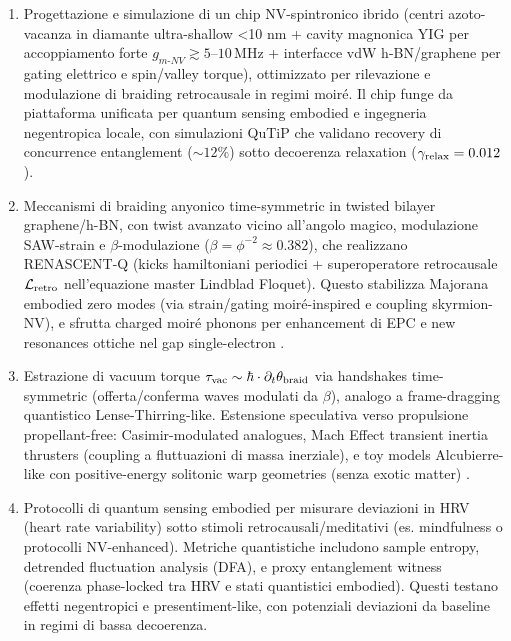 \documentclass[11pt,a4paper]{article}
\let\oldcite\cite
\renewcommand{\cite}{\protect\oldcite}
\theoremstyle{plain}
\theoremstyle{definition}
\begin{document}
\begin{enumerate}
    \item Progettazione e simulazione di un chip NV-spintronico ibrido (centri azoto-vacanza in diamante ultra-shallow <10 nm + cavity magnonica YIG per accoppiamento forte $g_{m\text{-}NV} \gtrsim 5$--$10\,\text{MHz}$ + interfacce vdW h-BN/graphene per gating elettrico e spin/valley torque), ottimizzato per rilevazione e modulazione di braiding retrocausale in regimi moiré. Il chip funge da piattaforma unificata per quantum sensing embodied e ingegneria negentropica locale, con simulazioni QuTiP che validano recovery di concurrence entanglement ($\sim 12\%$) sotto decoerenza relaxation ($\gamma_{\rm relax} = 0.012$).

    \item Meccanismi di braiding anyonico time-symmetric in twisted bilayer graphene/h-BN, con twist avanzato vicino all'angolo magico, modulazione SAW-strain e $\beta$-modulazione ($\beta = \phi^{-2} \approx 0.382$), che realizzano RENASCENT-Q (kicks hamiltoniani periodici + superoperatore retrocausale $\mathcal{L}_{\rm retro}$ nell'equazione master Lindblad Floquet). Questo stabilizza Majorana embodied zero modes (via strain/gating moiré-inspired e coupling skyrmion-NV), e sfrutta charged moiré phonons per enhancement di EPC e new resonances ottiche nel gap single-electron \cite{ramosalonso2026chargedmoire}.

    \item Estrazione di vacuum torque $\tau_{\rm vac} \sim \hbar \cdot \partial_t \theta_{\rm braid}$ via handshakes time-symmetric (offerta/conferma waves modulati da $\beta$), analogo a frame-dragging quantistico Lense-Thirring-like. Estensione speculativa verso propulsione propellant-free: Casimir-modulated analogues, Mach Effect transient inertia thrusters (coupling a fluttuazioni di massa inerziale), e toy models Alcubierre-like con positive-energy solitonic warp geometries (senza exotic matter) \cite{woodwardmach, lentz2021positivewarp}.

    \item Protocolli di quantum sensing embodied per misurare deviazioni in HRV (heart rate variability) sotto stimoli retrocausali/meditativi (es. mindfulness o protocolli NV-enhanced). Metriche quantistiche includono sample entropy, detrended fluctuation analysis (DFA), e proxy entanglement witness (coerenza phase-locked tra HRV e stati quantistici embodied). Questi testano effetti negentropici e presentiment-like, con potenziali deviazioni da baseline in regimi di bassa decoerenza.


\end{enumerate}
\end{document}
